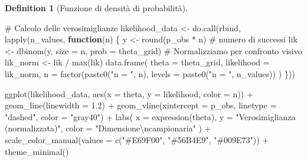 \documentclass[
  letterpaper,
  DIV=11,
  numbers=noendperiod,
  oneside]{scrreprt}
\newenvironment{Shaded}{\begin{snugshade}}{\end{snugshade}}
\newcommand{\AttributeTok}[1]{\textcolor[rgb]{0.40,0.45,0.13}{#1}}
\newcommand{\CommentTok}[1]{\textcolor[rgb]{0.37,0.37,0.37}{#1}}
\newcommand{\ControlFlowTok}[1]{\textcolor[rgb]{0.00,0.23,0.31}{\textbf{#1}}}
\newcommand{\FloatTok}[1]{\textcolor[rgb]{0.68,0.00,0.00}{#1}}
\newcommand{\FunctionTok}[1]{\textcolor[rgb]{0.28,0.35,0.67}{#1}}
\newcommand{\NormalTok}[1]{\textcolor[rgb]{0.00,0.23,0.31}{#1}}
\newcommand{\OtherTok}[1]{\textcolor[rgb]{0.00,0.23,0.31}{#1}}
\newcommand{\SpecialCharTok}[1]{\textcolor[rgb]{0.37,0.37,0.37}{#1}}
\newcommand{\StringTok}[1]{\textcolor[rgb]{0.13,0.47,0.30}{#1}}
\theoremstyle{definition}
\theoremstyle{plain}
\theoremstyle{definition}
\newtheorem{definition}{Definition}[chapter]
\theoremstyle{remark}
\begin{document}
\begin{definition}[Funzione di densità di
probabilità]
\begin{Shaded}
\begin{Highlighting}[]
\CommentTok{\# Calcolo delle verosimiglianze}
\NormalTok{likelihood\_data }\OtherTok{\textless{}{-}} \FunctionTok{do.call}\NormalTok{(rbind, }\FunctionTok{lapply}\NormalTok{(n\_values, }\ControlFlowTok{function}\NormalTok{(n) \{}
\NormalTok{  y }\OtherTok{\textless{}{-}} \FunctionTok{round}\NormalTok{(p\_obs }\SpecialCharTok{*}\NormalTok{ n)  }\CommentTok{\# numero di successi}
\NormalTok{  lik }\OtherTok{\textless{}{-}} \FunctionTok{dbinom}\NormalTok{(y, }\AttributeTok{size =}\NormalTok{ n, }\AttributeTok{prob =}\NormalTok{ theta\_grid)}
  \CommentTok{\# Normalizziamo per confronto visivo}
\NormalTok{  lik\_norm }\OtherTok{\textless{}{-}}\NormalTok{ lik }\SpecialCharTok{/} \FunctionTok{max}\NormalTok{(lik)}
  \FunctionTok{data.frame}\NormalTok{(}
    \AttributeTok{theta =}\NormalTok{ theta\_grid,}
    \AttributeTok{likelihood =}\NormalTok{ lik\_norm,}
    \AttributeTok{n =} \FunctionTok{factor}\NormalTok{(}\FunctionTok{paste0}\NormalTok{(}\StringTok{"n = "}\NormalTok{, n), }\AttributeTok{levels =} \FunctionTok{paste0}\NormalTok{(}\StringTok{"n = "}\NormalTok{, n\_values))}
\NormalTok{  )}
\NormalTok{\}))}

\FunctionTok{ggplot}\NormalTok{(likelihood\_data, }\FunctionTok{aes}\NormalTok{(}\AttributeTok{x =}\NormalTok{ theta, }\AttributeTok{y =}\NormalTok{ likelihood, }\AttributeTok{color =}\NormalTok{ n)) }\SpecialCharTok{+}
  \FunctionTok{geom\_line}\NormalTok{(}\AttributeTok{linewidth =} \FloatTok{1.2}\NormalTok{) }\SpecialCharTok{+}
  \FunctionTok{geom\_vline}\NormalTok{(}\AttributeTok{xintercept =}\NormalTok{ p\_obs, }\AttributeTok{linetype =} \StringTok{"dashed"}\NormalTok{, }\AttributeTok{color =} \StringTok{"gray40"}\NormalTok{) }\SpecialCharTok{+}
  \FunctionTok{labs}\NormalTok{(}
    \AttributeTok{x =} \FunctionTok{expression}\NormalTok{(theta),}
    \AttributeTok{y =} \StringTok{"Verosimiglianza (normalizzata)"}\NormalTok{,}
    \AttributeTok{color =} \StringTok{"Dimensione}\SpecialCharTok{\textbackslash{}n}\StringTok{campionaria"}
\NormalTok{  ) }\SpecialCharTok{+}
  \FunctionTok{scale\_color\_manual}\NormalTok{(}\AttributeTok{values =} \FunctionTok{c}\NormalTok{(}\StringTok{"\#E69F00"}\NormalTok{, }\StringTok{"\#56B4E9"}\NormalTok{, }\StringTok{"\#009E73"}\NormalTok{)) }\SpecialCharTok{+}
  \FunctionTok{theme\_minimal}\NormalTok{() }
\end{Highlighting}
\end{Shaded}

\begin{figure}[H]

\centering{

}
\end{figure}
\end{definition}
\end{document}
